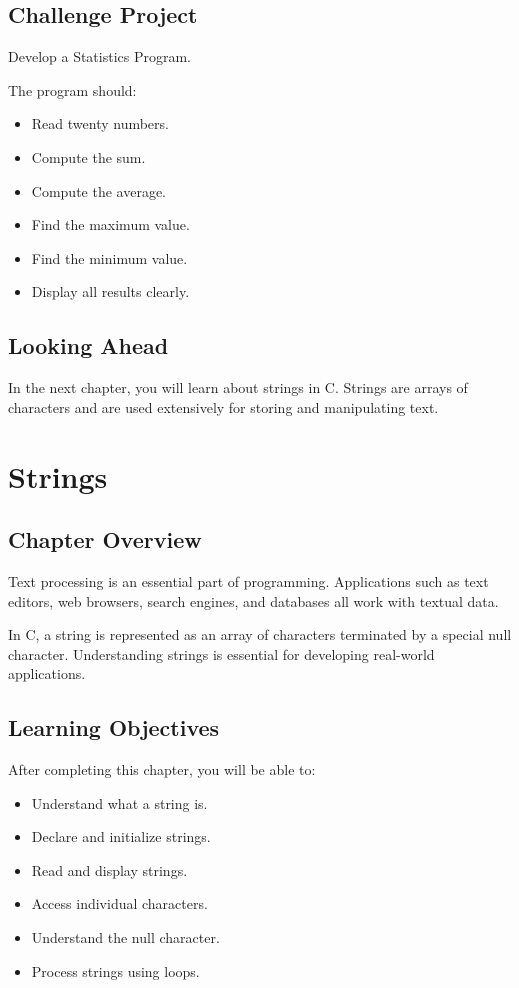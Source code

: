 \documentclass[12pt,openany]{book}
\begin{document}
\section{Challenge Project}

Develop a Statistics Program.

The program should:

\begin{itemize}
    \item Read twenty numbers.
    \item Compute the sum.
    \item Compute the average.
    \item Find the maximum value.
    \item Find the minimum value.
    \item Display all results clearly.
\end{itemize}

\section{Looking Ahead}

In the next chapter, you will learn about strings in C. Strings are arrays of characters and are used extensively for storing and manipulating text.
\chapter{Strings}

\section{Chapter Overview}

Text processing is an essential part of programming. Applications such as text editors, web browsers, search engines, and databases all work with textual data.

In C, a string is represented as an array of characters terminated by a special null character. Understanding strings is essential for developing real-world applications.

\section{Learning Objectives}

After completing this chapter, you will be able to:

\begin{itemize}
    \item Understand what a string is.
    \item Declare and initialize strings.
    \item Read and display strings.
    \item Access individual characters.
    \item Understand the null character.
    \item Process strings using loops.
\end{itemize}
\end{document}
